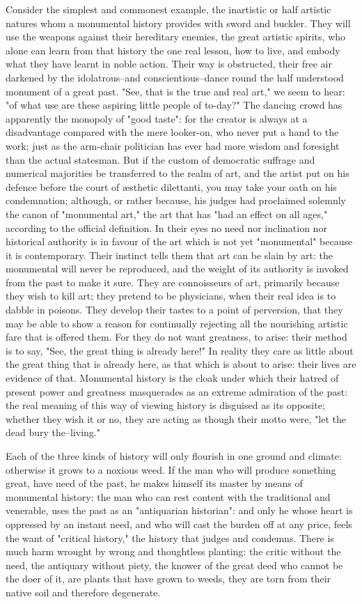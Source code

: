 Consider the simplest and commonest example, the inartistic or half
artistic natures whom a monumental history provides with sword and
buckler. They will use the weapons against their hereditary enemies,
the great artistic spirits, who alone can learn from that history the
one real lesson, how to live, and embody what they have learnt in
noble action. Their way is obstructed, their free air darkened by the
idolatrous--and conscientious--dance round the half understood
monument of a great past. "See, that is the true and real art," we
seem to hear: "of what use are these aspiring little people of
to-day?" The dancing crowd has apparently the monopoly of "good
taste": for the creator is always at a disadvantage compared with the
mere looker-on, who never put a hand to the work; just as the
arm-chair politician has ever had more wisdom and foresight than the
actual statesman. But if the custom of democratic suffrage and
numerical majorities be transferred to the realm of art, and the
artist put on his defence before the court of æsthetic dilettanti,
you may take your oath on his condemnation; although, or rather
because, his judges had proclaimed solemnly the canon of "monumental
art," the art that has "had an effect on all ages," according to the
official definition. In their eyes no need nor inclination nor
historical authority is in favour of the art which is not yet
"monumental" because it is contemporary. Their instinct tells them
that art can be slain by art: the monumental will never be
reproduced, and the weight of its authority is invoked from the past
to make it sure. They are connoisseurs of art, primarily because they
wish to kill art; they pretend to be physicians, when their real idea
is to dabble in poisons. They develop their tastes to a point of
perversion, that they may be able to show a reason for continually
rejecting all the nourishing artistic fare that is offered them. For
they do not want greatness, to arise: their method is to say, "See,
the great thing is already here!" In reality they care as little
about the great thing that is already here, as that which is about to
arise: their lives are evidence of that. Monumental history is the
cloak under which their hatred of present power and greatness
masquerades as an extreme admiration of the past: the real meaning of
this way of viewing history is disguised as its opposite; whether
they wish it or no, they are acting as though their motto were, "let
the dead bury the--living."

Each of the three kinds of history will only flourish in one ground
and climate: otherwise it grows to a noxious weed. If the man who
will produce something great, have need of the past, he makes himself
its master by means of monumental history: the man who can rest
content with the traditional and venerable, uses the past as an
"antiquarian historian": and only he whose heart is oppressed by an
instant need, and who will cast the burden off at any price, feels
the want of "critical history," the history that judges and condemns.
There is much harm wrought by wrong and thoughtless planting: the
critic without the need, the antiquary without piety, the knower of
the great deed who cannot be the doer of it, are plants that have
grown to weeds, they are torn from their native soil and therefore
degenerate.


